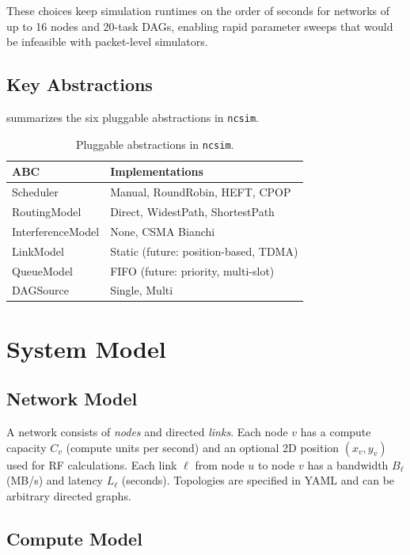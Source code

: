 \documentclass[conference]{IEEEtran}
\newcommand{\ncsim}{\texttt{ncsim}}
\begin{document}
\noindent These choices keep simulation runtimes on the order of seconds for
networks of up to 16 nodes and 20-task DAGs, enabling rapid parameter sweeps
that would be infeasible with packet-level simulators.

\subsection{Key Abstractions}

 summarizes the six pluggable abstractions in \ncsim{}.

\begin{table}[t]
\centering
\caption{Pluggable abstractions in \ncsim{}.}
\label{tab:abstractions}
\begin{tabular}{@{}lp{4.8cm}@{}}
\toprule
\textbf{ABC} & \textbf{Implementations} \\
\midrule
Scheduler & Manual, RoundRobin, HEFT, CPOP \\
RoutingModel & Direct, WidestPath, ShortestPath \\
InterferenceModel & None, CSMA Bianchi \\
LinkModel & Static (future: position-based, TDMA) \\
QueueModel & FIFO (future: priority, multi-slot) \\
DAGSource & Single, Multi \\
\bottomrule
\end{tabular}
\end{table}

\section{System Model}
\label{sec:model}

\subsection{Network Model}

A network consists of \emph{nodes} and directed \emph{links}.  Each node $v$
has a compute capacity $C_v$ (compute units per second) and an optional 2D
position $(x_v, y_v)$ used for RF calculations.  Each link $\ell$ from node
$u$ to node $v$ has a bandwidth $B_\ell$ (MB/s) and latency $L_\ell$
(seconds).  Topologies are specified in YAML and can be arbitrary directed
graphs.

\subsection{Compute Model}
\end{document}
